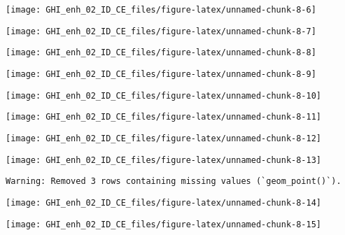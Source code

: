 \documentclass[
  10pt,
  a4paper,oneside]{article}
\begin{document}
\begin{center}\texttt{[image: GHI\_enh\_02\_ID\_CE\_files/figure-latex/unnamed-chunk-8-6]} \end{center}

\begin{center}\texttt{[image: GHI\_enh\_02\_ID\_CE\_files/figure-latex/unnamed-chunk-8-7]} \end{center}

\begin{center}\texttt{[image: GHI\_enh\_02\_ID\_CE\_files/figure-latex/unnamed-chunk-8-8]} \end{center}

\begin{center}\texttt{[image: GHI\_enh\_02\_ID\_CE\_files/figure-latex/unnamed-chunk-8-9]} \end{center}

\begin{center}\texttt{[image: GHI\_enh\_02\_ID\_CE\_files/figure-latex/unnamed-chunk-8-10]} \end{center}

\begin{center}\texttt{[image: GHI\_enh\_02\_ID\_CE\_files/figure-latex/unnamed-chunk-8-11]} \end{center}

\begin{center}\texttt{[image: GHI\_enh\_02\_ID\_CE\_files/figure-latex/unnamed-chunk-8-12]} \end{center}

\begin{center}\texttt{[image: GHI\_enh\_02\_ID\_CE\_files/figure-latex/unnamed-chunk-8-13]} \end{center}

\begin{verbatim}
Warning: Removed 3 rows containing missing values (`geom_point()`).
\end{verbatim}

\begin{center}\texttt{[image: GHI\_enh\_02\_ID\_CE\_files/figure-latex/unnamed-chunk-8-14]} \end{center}

\begin{center}\texttt{[image: GHI\_enh\_02\_ID\_CE\_files/figure-latex/unnamed-chunk-8-15]} \end{center}
\end{document}
